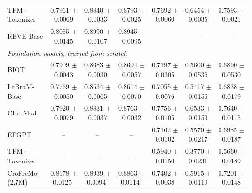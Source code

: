 \begin{table}[t]
{\begin{tabular}{lcccccc}
TFM-Tokenizer & 0.7961 $\pm$ 0.0069 & 0.8840 $\pm$ 0.0033 & 0.8793 $\pm$ 0.0025 & 0.7692 $\pm$ 0.0060 & 0.6454 $\pm$ 0.0035 & 0.7593 $\pm$ 0.0021 \\
REVE-Base & 0.8055 $\pm$ 0.0145 & 0.8990 $\pm$ 0.0107 & 0.8945 $\pm$ 0.0095 & -- & -- & -- \\
\midrule
\multicolumn{7}{l}{\textit{Foundation models, trained from scratch}} \\
BIOT & 0.7909 $\pm$ 0.0043 & 0.8683 $\pm$ 0.0030 & 0.8694 $\pm$ 0.0057 & 0.7197 $\pm$ 0.0305 & 0.5600 $\pm$ 0.0536 & 0.6890 $\pm$ 0.0530 \\
LaBraM-Base & 0.7769 $\pm$ 0.0050 & 0.8534 $\pm$ 0.0065 & 0.8614 $\pm$ 0.0070 & 0.7055 $\pm$ 0.0076 & 0.5417 $\pm$ 0.0155 & 0.6838 $\pm$ 0.0179 \\
CBraMod & 0.7920 $\pm$ 0.0079 & 0.8831 $\pm$ 0.0037 & 0.8763 $\pm$ 0.0032 & 0.7756 $\pm$ 0.0105 & 0.6533 $\pm$ 0.0159 & 0.7640 $\pm$ 0.0115 \\
EEGPT & -- & -- & -- & 0.7162 $\pm$ 0.0102 & 0.5570 $\pm$ 0.0217 & 0.6985 $\pm$ 0.0187 \\
TFM-Tokenizer & -- & -- & -- & 0.5940 $\pm$ 0.0150 & 0.3770 $\pm$ 0.0231 & 0.5660 $\pm$ 0.0189 \\
\midrule
CroFreMo (2.7M) & 0.8178 $\pm$ 0.0125$^{\dagger}$ & 0.8939 $\pm$ 0.0094$^{\dagger}$ & 0.8863 $\pm$ 0.0114$^{\dagger}$ & 0.7402 $\pm$ 0.0038 & 0.5915 $\pm$ 0.0119 & 0.7201 $\pm$ 0.0148 \\
\bottomrule
\end{tabular}}
\end{table}

